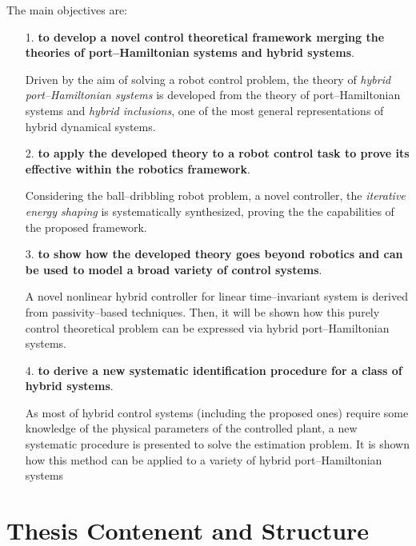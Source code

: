 The main objectives are:
%
\begin{itemize}
    \item [1.] \textbf{to develop a novel control theoretical framework merging the theories of port--Hamiltonian systems and hybrid systems}.
    
    Driven by the aim of solving a robot control problem, the theory of \textit{hybrid port--Hamiltonian systems} is developed from the theory of port--Hamiltonian systems and \textit{hybrid inclusions}, one of the most general representations of hybrid dynamical systems.
    \newline
    \item [2.] \textbf{to apply the developed theory to a robot control task to prove its effective within the robotics framework}. 
    
    Considering the ball--dribbling robot problem, a novel controller, the \textit{iterative energy shaping} is systematically synthesized, proving the the capabilities of the proposed framework.
    \newline
    \item [3.] \textbf{to show how the developed theory goes beyond robotics and can be used to model a broad variety of control systems}. 
    
    A novel nonlinear hybrid controller for linear time--invariant system is derived from passivity--based techniques. Then, it will be shown how this purely control theoretical problem can be expressed via hybrid port--Hamiltonian systems.
    \newline
    \item[4.] \textbf{to derive a new systematic identification procedure for a class of hybrid systems}.
    
    As most of hybrid control systems (including the proposed ones) require some knowledge of the physical parameters of the controlled plant, a new systematic procedure is presented to solve the estimation problem. It is shown how this method can be applied to a variety of hybrid port--Hamiltonian systems 
    
    \end{itemize}
%





%
\clearpage

\section{Thesis Contenent and Structure}
